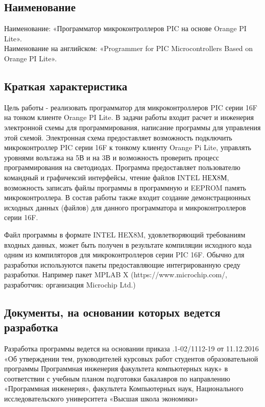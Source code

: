\subsection{Наименование}
Наименование: «Программатор микроконтроллеров PIC на основе Orange PI Lite». \\
Наименование на английском: «Programmer for PIC Microcontrollers Based on Orange PI Lite». \\


\subsection{Краткая характеристика}
    Цель работы - реализовать программатор для микроконтроллеров PIC серии 16F на тонком клиенте Orange PI Lite.
    В задачи работы входит расчет и инженерия электронной схемы для программирования, написание программы для управления этой схемой.
    Электронная схема предоставляет возможность подключить микроконтроллер PIC серии 16F к тонкому клиенту Orange Pi Lite, управлять уровнями вольтажа на 5В и на 3В и возможность проверить процесс программирования на светодиодах.         
    Программа предоставляет пользователю командный и графичексий интерфейсы, чтение файлов INTEL HЕХ8М, возможность записать файлы программы в программную и EEPROM память микроконтроллера.
    В состав работы также входит создание демонстрационных исходных данных (файлов) для данного программатора и микроконтроллеров серии 16F.

\smallskip
Файл программы в формате INTEL HEX8M, удовлетворяющий требованиям входных данных, может быть получен в результате компиляции исходного кода одним из компиляторов для микроконтроллеров серии PIC 16F. Обычно для разработки используются пакеты предоставляющие интегрированную среду разработки. Например пакет MPLAB X (https://www.microchip.com/, разработчик: организация Microchip Ltd.)


\subsection{Документы, на основании которых ведется разработка}
Разработка программы ведется на основании приказа 
.1-02/1112-19 от 11.12.2016
«Об  утверждении  тем,  руководителей  курсовых  работ  студентов
образовательной  программы  Программная  инженерия 
факультета 
компьютерных наук» в соответствии с учебным планом подготовки бакалавров по направлению «Программная инженерия», факультета Компьютерных наук,
Национального исследовательского университета «Высшая школа экономики» 